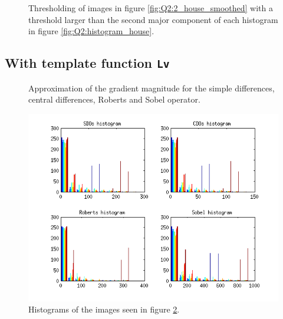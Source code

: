\begin{figure}[H]
	\centering
	\scalebox{0.9}{}
	\caption{Thresholding of images in figure \ref{fig:Q2:2_house_smoothed} with a threshold larger than the second major component of
	each histogram in figure \ref{fig:Q2:histogram_house}.}
	\label{fig:Q2:threshold_house_2}
\end{figure}












\subsection{With template function \texttt{Lv}}

\begin{figure}[H]
	\centering
	\scalebox{0.7}{}
	\caption{Approximation of the gradient magnitude for the simple differences, central differences, Roberts and Sobel operator.}
	\label{fig:Q2:2_tools_with_lv}
\end{figure}

\begin{figure}[H]
	\centering
	\includegraphics[scale=0.8]{./images/Q2/with_lv/tools/histogram_1.png}
	\caption{Histograms of the images seen in figure \ref{fig:Q2:2_tools_with_lv}.}
	\label{fig:Q2:histogram_tools_with_lv}
\end{figure}


